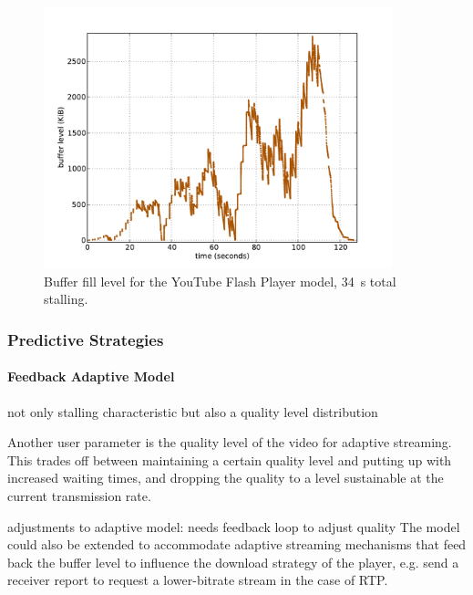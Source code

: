 \begin{figure}[htb]
    \centering
    \includegraphics[width=0.9\textwidth]{images/bufferlevel-flash-new.pdf}
    \caption{Buffer fill level for the YouTube Flash Player model, \SI{34}{\second} total stalling.}
    \label{c3:fig:bufferlevel-flash}
\end{figure}


\subsubsection{Predictive Strategies}



\paragraph{Feedback Adaptive Model}

not only stalling characteristic but also a quality level distribution

Another user parameter is the quality level of the video for adaptive streaming. This trades off between maintaining a certain quality level and putting up with increased waiting times, and dropping the quality to a level sustainable at the current transmission rate.

adjustments to adaptive model: needs feedback loop to adjust quality
The model could also be extended to accommodate adaptive streaming mechanisms that feed back the buffer level to influence the download strategy of the player, e.g. send a receiver report to request a lower-bitrate stream in the case of RTP. %



